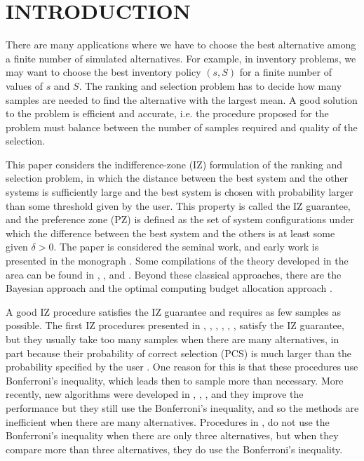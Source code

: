 \documentclass{wscpaperproc}
\theoremstyle{wsc}
\begin{document}
\section{INTRODUCTION}
\label{sec:intro}


There are many applications where we have to choose the best alternative
among a finite number of simulated alternatives. For example, in inventory problems, we may want to choose the best inventory policy $(s,S)$ for a finite number of values of $s$ and $S$. The ranking and selection problem has to decide how many samples are needed to find the alternative with the largest mean. A good solution to the problem is efficient and accurate, i.e. the procedure proposed for the problem must balance between the number of samples required and quality of the selection.



This paper considers the indifference-zone (IZ) formulation of
the ranking and selection problem, in which the distance between the best system and
the other systems is sufficiently large and the best system is chosen with probability larger
than some threshold given by the user. This property is called the IZ guarantee, and the preference zone (PZ)
is defined as the set of system configurations under which the difference between the best system and the others is
at least some given  $\delta>0$. The paper  is considered the seminal work, and early work is 
presented in the monograph . Some compilations of the theory developed in the area can be found
in , ,  and . Beyond these classical approaches, 
there are the Bayesian approach \cite{Frazier:Tutorial} and the optimal computing budget allocation approach \cite{chen:ocva}.

A good IZ procedure satisfies the IZ guarantee and requires as few samples as possible.
The first IZ procedures presented in , , , ,
, ,  
satisfy the IZ guarantee, but they usually take too many samples when there are many alternatives,
in part because their probability of correct selection (PCS) is much
larger than the probability specified by the user \cite{kim:Conserv}. One reason for this
is that these procedures use Bonferroni's inequality, which leads then to sample more
than necessary. More recently, new algorithms were developed in , , 
, and they improve the performance but they still
use the Bonferroni's inequality, and so the methods are inefficient
when there are many alternatives. Procedures in ,
 do not use the Bonferroni's inequality 
when there are only three alternatives, but when they compare more than three
alternatives, they do use the Bonferroni's inequality.
\end{document}
